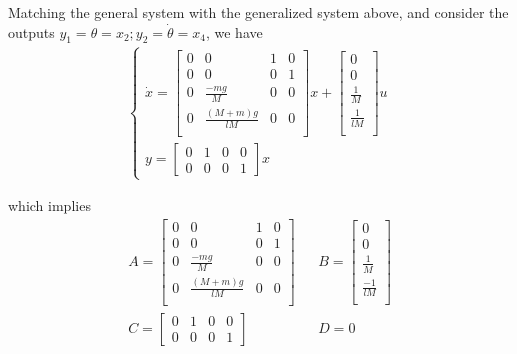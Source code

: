 \documentclass [12pt,letterpaper]{exam}
\begin{document}
Matching the general system with the generalized system above, and consider the outputs $y_1 = \theta = x_2 ; y_2 = \dot{\theta} = x_4$, we have
\begin{align}
\begin{cases}
\dot{x} = \begin{bmatrix}
0 & 0 & 1 & 0 \\
0 & 0 & 0 & 1 \\
0 & \frac{-mg}{M} & 0 & 0 \\
0 & \frac{(M + m)g}{lM} & 0 & 0 \\
\end{bmatrix} x
+
\begin{bmatrix}
0 \\
0 \\
\frac{1}{M} \\
\frac{1}{lM} \\
\end{bmatrix} u \\
y = \begin{bmatrix}
0 & 1 & 0 & 0 \\
0 & 0 & 0 & 1
\end{bmatrix} x
\end{cases}
\end{align}

which implies
\begin{align}
A = \begin{bmatrix}
0 & 0 & 1 & 0 \\
0 & 0 & 0 & 1 \\
0 & \frac{-mg}{M} & 0 & 0 \\
0 & \frac{(M + m)g}{lM} & 0 & 0 \\
\end{bmatrix} & &
B = \begin{bmatrix}
0 \\
0 \\
\frac{1}{M} \\
\frac{-1}{lM} \\
\end{bmatrix} \\
C = \begin{bmatrix}
0 & 1 & 0 & 0 \\
0 & 0 & 0 & 1
\end{bmatrix} & &
D = 0
\end{align}
\end{document}
